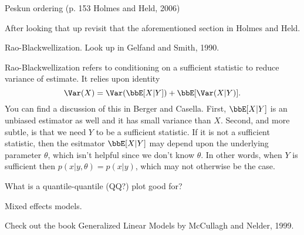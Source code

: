 \documentclass{article}
\begin{document}
\begin{outline}

\1 Peskun ordering (p. 153 Holmes and Held, 2006)

  \2 After looking that up revisit that the aforementioned section in Holmes and
  Held.

\1 Rao-Blackwellization.  Look up in Gelfand and Smith, 1990.

\2 Rao-Blackwellization refers to conditioning on a sufficient statistic to
reduce variance of estimate.  It relies upon identity
\[
\Var(X) = \Var(\bbE[X|Y]) + \bbE[\Var(X|Y)].
\]
You can find a discussion of this in Berger and Casella.  First, $\bbE[X|Y]$ is
an unbiased estimator as well and it has small variance than $X$.  Second, and
more subtle, is that we need $Y$ to be a sufficient statistic.  If it is not a
sufficient statistic, then the esitmator $\bbE[X|Y]$ may depend upon the
underlying parameter $\theta$, which isn't helpful since we don't know $\theta$.
In other words, when $Y$ is sufficient then $p(x | y, \theta) = p(x | y)$, which
may not otherwise be the case.


\1 What is a quantile-quantile (QQ?) plot good for?

\1 Mixed effects models.

\1 Check out the book Generalized Linear Models by McCullagh and Nelder, 1999.

\end{outline}

{}

\end{document}
